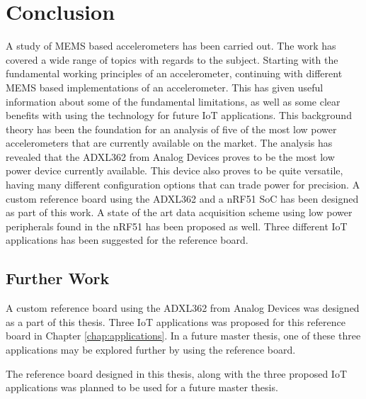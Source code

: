 \chapter{Conclusion}

A study of MEMS based accelerometers has been carried out. The work has covered a wide range of topics with regards to the subject. Starting with the fundamental working principles of an accelerometer, continuing with different MEMS based implementations of an accelerometer. This has given useful information about some of the fundamental limitations, as well as some clear benefits with using the technology for future IoT applications. This background theory has been the foundation for an analysis of five of the most low power accelerometers that are currently available on the market. The analysis has revealed that the ADXL362 from Analog Devices proves to be the most low power device currently available. This device also proves to be quite versatile, having many different configuration options that can trade power for precision. A custom reference board using the ADXL362 and a nRF51 SoC has been designed as part of this work. A state of the art data acquisition scheme using low power peripherals found in the nRF51 has been proposed as well. Three different IoT applications has been suggested for the reference board.

\section{Further Work}

A custom reference board using the ADXL362 from Analog Devices was designed as a part of this thesis. Three IoT applications was proposed for this reference board in Chapter \ref{chap:applications}. In a future master thesis, one of these three applications may be explored further by using the reference board. 

The reference board designed in this thesis, along with the three proposed IoT applications was planned to be used for a future master thesis.
